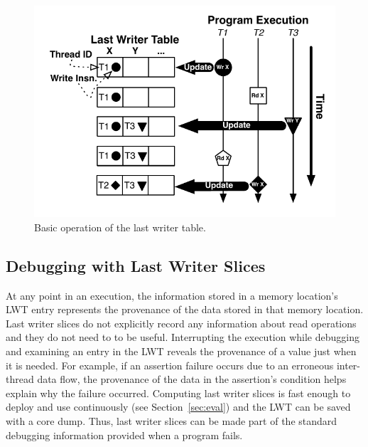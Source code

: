 \documentclass[preprint,9pt]{sigplanconf}
\newcommand{\lwt}{LWT\xspace}
\begin{document}
\begin{figure}[h]
\centering
\includegraphics[scale=.6]{figs/BasicLWT.pdf}
\caption{\label{fig:basicLWT}Basic operation of the last writer table. }
\end{figure}


\subsection{Debugging with Last Writer Slices}
\label{sec:debugging}

At any point in an execution, the information stored in a memory location's
\lwt entry represents the provenance of the data stored in that memory
location.   Last writer slices do not explicitly record any information about
read operations and they do not need to to be useful.  Interrupting the
execution while debugging and examining an entry in the \lwt reveals the
provenance of a value just when it is needed.  For example, if an assertion
failure occurs due to an erroneous inter-thread data flow, the provenance of
the data in the assertion's condition helps explain why the failure occurred.
Computing last writer slices is fast enough to deploy and use continuously
(see Section~\ref{sec:eval}) and the \lwt can be saved with a core dump.
Thus, last writer slices can be made part of the standard debugging
information provided when a program fails.  
\end{document}

